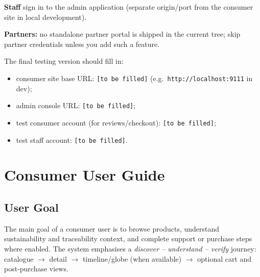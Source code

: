 \documentclass[11pt]{article}
\begin{document}
\textbf{Staff} sign in to the admin application (separate origin/port from the consumer site in local development).

\textbf{Partners:} no standalone partner portal is shipped in the current tree; skip partner credentials unless you add such a feature.

The final testing version should fill in:
\begin{itemize}[leftmargin=2.2em]
    \item consumer site base URL: \texttt{[to be filled]} (e.g.\ \texttt{http://localhost:9111} in dev);
    \item admin console URL: \texttt{[to be filled]};
    \item test consumer account (for reviews/checkout): \texttt{[to be filled]};
    \item test staff account: \texttt{[to be filled]}.
\end{itemize}

\section{Consumer User Guide}
\subsection{User Goal}
The main goal of a consumer user is to browse products, understand sustainability and traceability context, and complete support or purchase steps where enabled. The system emphasises a \emph{discover -- understand -- verify} journey: catalogue $\rightarrow$ detail $\rightarrow$ timeline/globe (when available) $\rightarrow$ optional cart and post-purchase views.
\end{document}
